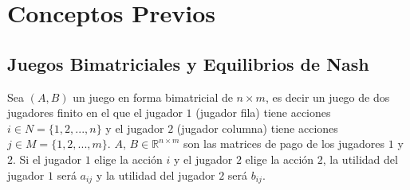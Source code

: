\newcommand{\concept}{\textbf}
\newcommand{\pstrat}{\widetilde}

\chapter{Conceptos Previos}  \label{cap:previos}

\section{Juegos Bimatriciales y Equilibrios de Nash}



Sea $(A, B)$ un juego en forma bimatricial de $n \times m$, es decir un juego de dos jugadores finito en el que el jugador $1$ (jugador fila) tiene acciones $i \in N = \{1, 2, ..., n\}$ y el jugador $2$ (jugador columna) tiene acciones $j \in M = \{1, 2, ..., m\}$. $A$, $B \in \mathbb{R}^{n \times m}$ son las matrices de pago de los jugadores $1$ y $2$. Si el jugador $1$ elige la acción $i$ y el jugador $2$ elige la acción $2$, la utilidad del jugador $1$ será $a_{ij}$ y la utilidad del jugador $2$ será $b_{ij}$.

